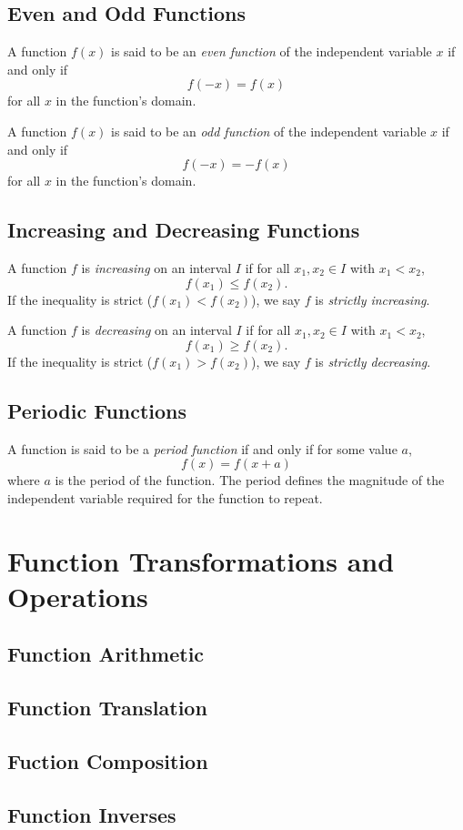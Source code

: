 \subsection{Even and Odd Functions}
\begin{definition}
    A function $f(x)$ is said to be an \textit{even function} of the independent variable $x$ if and only if
    $$
    f(-x) = f(x)
    $$
    for all $x$ in the function's domain.
\end{definition}

\begin{definition}
    A function $f(x)$ is said to be an \textit{odd function} of the independent variable $x$ if and only if
    $$
    f(-x) = -f(x)
    $$
    for all $x$ in the function's domain.
\end{definition}

\subsection{Increasing and Decreasing Functions}
\begin{definition}
    A function $f$ is \textit{increasing} on an interval $I$ if for all $x_1, x_2 \in I$ with $x_1 < x_2$,
    $$
    f(x_1) \leq f(x_2).
    $$
    If the inequality is strict ($f(x_1) < f(x_2)$), we say $f$ is \textit{strictly increasing}.
\end{definition}

\begin{definition}
    A function $f$ is \textit{decreasing} on an interval $I$ if for all $x_1, x_2 \in I$ with $x_1 < x_2$,
    $$
    f(x_1) \geq f(x_2).
    $$
    If the inequality is strict ($f(x_1) > f(x_2)$), we say $f$ is \textit{strictly decreasing}.
\end{definition}

\subsection{Periodic Functions}
\begin{definition}
    A function is said to be a \textit{period function} if and only if for some value $a$,
    $$
    f(x) = f(x+a)
    $$
    where $a$ is the period of the function. The period defines the magnitude of the independent variable required for the function to repeat.
\end{definition}

\section{Function Transformations and Operations}
\subsection{Function Arithmetic}
\subsection{Function Translation}
\subsection{Fuction Composition}
\subsection{Function Inverses}
